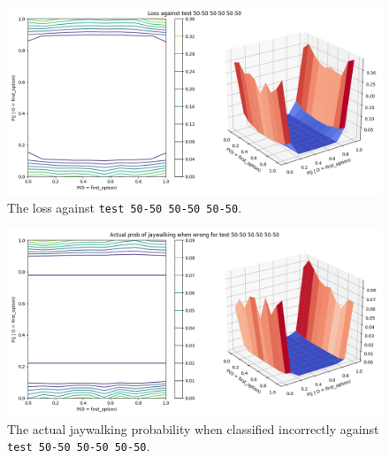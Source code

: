 \documentclass{report}
\newcommand{\code}{\texttt}
\begin{document}
\begin{figure}[h]
    \centering
    \includegraphics[width=\textwidth]{test_50-50_50-50_50-50_loss.png}
    \caption[]{The loss against \code{test 50-50 50-50 50-50}.}
    \label{fig:test_50-50_50-50_50-50_loss_plot}
\end{figure}

\begin{figure}[h]
    \centering
    \includegraphics[width=\textwidth]{test_50-50_50-50_50-50_jay_prob.png}
    \caption[]{The actual jaywalking probability when classified incorrectly against \code{test 50-50 50-50 50-50}.}
    \label{fig:test_50-50_50-50_50-50_jay_prob_plot}
\end{figure}
\end{document}
